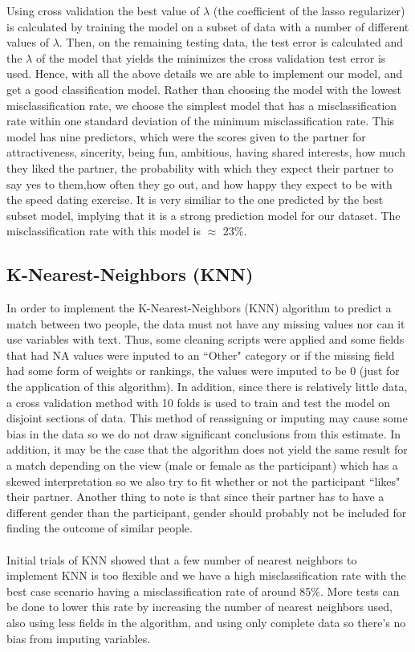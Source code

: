 \documentclass{article}
\begin{document}
Using cross validation the best value of $\lambda$ (the coefficient of the lasso regularizer) is calculated by training the model on a subset of data with a number of different values of $\lambda$.  Then, on the remaining testing data, the test error is calculated and the $\lambda$ of the model that yields the minimizes the cross validation test error is used. Hence, with all the above details we are able to implement our model, and get a good classification model. Rather than choosing the model with the lowest misclassification rate, we choose the simplest model that has a misclassification rate within one standard deviation of the minimum misclassification rate. This model has nine predictors, which were the scores given to the partner for attractiveness, sincerity, being fun, ambitious, having shared interests, how much they liked the partner, the probability with which they expect their partner to say yes to them,how often they go out, and how happy they expect to be with the speed dating exercise. It is very similiar to the one predicted by the best subset model, implying that it is a strong prediction model for our dataset. The misclassification rate with this model is $\approx$ 23\%.
%
\subsection{K-Nearest-Neighbors (KNN)}
\label{sec:KNN}
In order to implement the K-Nearest-Neighbors (KNN) algorithm to predict a match between two people, the data must not have any missing values nor can it use variables with text.  Thus, some cleaning scripts were applied and some fields that had NA values were inputed to an ``Other" category or if the missing field had some form of weights or rankings, the values were imputed to be 0 (just for the application of this algorithm).  In addition, since there is relatively little data, a cross validation method with 10 folds is used to train and test the model on disjoint sections of data.  This method of reassigning or imputing may cause some bias in the data so we do not draw significant conclusions from this estimate.  In addition, it may be the case that the algorithm does not yield the same result for a match depending on the view (male or female as the participant) which has a skewed interpretation so we also try to fit whether or not the participant ``likes" their partner.  Another thing to note is that since their partner has to have a different gender than the participant, gender should probably not be included for finding the outcome of similar people.\\
\null\\
Initial trials of KNN showed that a few number of nearest neighbors to implement KNN is too flexible and we have a high misclassification rate with the best case scenario having a misclassification rate of around 85\%.  More tests can be done to lower this rate by increasing the number of nearest neighbors used, also using less fields in the algorithm, and using only complete data so there's no bias from imputing variables.
%
\end{document}
